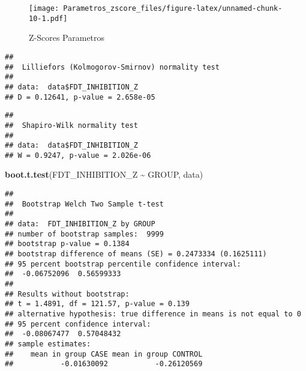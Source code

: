 \documentclass[
]{article}
\newenvironment{Shaded}{\begin{snugshade}}{\end{snugshade}}
\newcommand{\FunctionTok}[1]{\textcolor[rgb]{0.13,0.29,0.53}{\textbf{#1}}}
\newcommand{\NormalTok}[1]{#1}
\newcommand{\SpecialCharTok}[1]{\textcolor[rgb]{0.81,0.36,0.00}{\textbf{#1}}}
\begin{document}
\begin{figure}
\centering
\texttt{[image: Parametros\_zscore\_files/figure-latex/unnamed-chunk-10-1.pdf]}
\caption{Z-Scores Parametros}
\end{figure}

\begin{Shaded}
\end{Shaded}

\begin{verbatim}
## 
##  Lilliefors (Kolmogorov-Smirnov) normality test
## 
## data:  data$FDT_INHIBITION_Z
## D = 0.12641, p-value = 2.658e-05
\end{verbatim}

\begin{Shaded}
\end{Shaded}

\begin{verbatim}
## 
##  Shapiro-Wilk normality test
## 
## data:  data$FDT_INHIBITION_Z
## W = 0.9247, p-value = 2.026e-06
\end{verbatim}

\begin{Shaded}
\begin{Highlighting}[]
\FunctionTok{boot.t.test}\NormalTok{(FDT\_INHIBITION\_Z }\SpecialCharTok{\textasciitilde{}}\NormalTok{ GROUP, data)}
\end{Highlighting}
\end{Shaded}

\begin{verbatim}
## 
##  Bootstrap Welch Two Sample t-test
## 
## data:  FDT_INHIBITION_Z by GROUP
## number of bootstrap samples:  9999
## bootstrap p-value = 0.1384 
## bootstrap difference of means (SE) = 0.2473334 (0.1625111) 
## 95 percent bootstrap percentile confidence interval:
##  -0.06752096  0.56599333
## 
## Results without bootstrap:
## t = 1.4891, df = 121.57, p-value = 0.139
## alternative hypothesis: true difference in means is not equal to 0
## 95 percent confidence interval:
##  -0.08067477  0.57048432
## sample estimates:
##    mean in group CASE mean in group CONTROL 
##           -0.01630092           -0.26120569
\end{verbatim}
\end{document}
